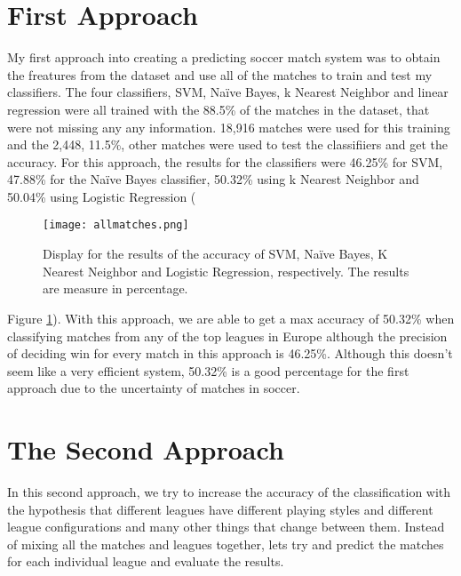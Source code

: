\documentclass[10pt,journal,compsoc]{IEEEtran}
\begin{document}
\section{First Approach}
My first approach into creating a predicting soccer match system was to obtain the freatures from the dataset and use all of the matches to train and test my classifiers. The four classifiers, SVM, Naïve Bayes, k Nearest Neighbor and linear regression were all trained with the 88.5\% of the matches in the dataset, that were not missing any any information. 18,916 matches were used for this training and the 2,448, 11.5\%, other matches were used to test the classifiiers and get the accuracy. For this approach, the results for the classifiers were 46.25\% for SVM, 47.88\% for the Naïve Bayes classifier, 50.32\% using k Nearest Neighbor and 50.04\% using Logistic Regression (\begin{figure}
  \texttt{[image: allmatches.png]}
  \caption{Display for the results of the accuracy of SVM, Naïve Bayes, K Nearest Neighbor and Logistic Regression, respectively. The results are measure in percentage.}
  \label{fig:allmatches}
\end{figure}
Figure \ref{fig:allmatches}). With this approach, we are able to get a max accuracy of 50.32\% when classifying matches from any of the top leagues in Europe although the precision of deciding win for every match in this approach is 46.25\%. Although this doesn’t seem like a very efficient system, 50.32\% is a good percentage for the first approach due to the uncertainty of matches in soccer.





\section{The Second Approach}
In this second approach, we try to increase the accuracy of the classification with the hypothesis that different leagues have different playing styles and different league configurations and many other things that change between them. Instead of mixing all the matches and leagues together, lets try and predict the matches for each individual league and evaluate the results.
\end{document}
